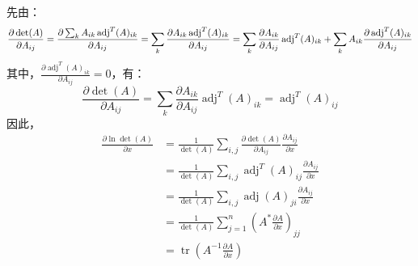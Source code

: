 \documentclass[UTF8,a4paper,AutoFakeBold,AutoFakeSlant]{article}
\begin{document}
\subsection{}
先由：
\begin{equation*}
  \frac{\partial \operatorname{det}(A)}{\partial A_{i j}}=\frac{\partial \sum_{k} A_{i k} \operatorname{adj}^{T}(A)_{i k}}{\partial A_{i j}}=\sum_{k} \frac{\partial A_{i k} \operatorname{adj}^{T}(A)_{i k}}{\partial A_{i j}} \\
  =\sum_{k} \frac{\partial A_{i k}}{\partial A_{i j}} \operatorname{adj}^{T}(A)_{i k}+\sum_{k} A_{i k} \frac{\partial \operatorname{adj}^{T}(A)_{i k}}{\partial A_{i j}}
\end{equation*}
其中，$ \frac{\partial \operatorname{adj}^{T}(A)_{i k}}{\partial A_{i j}} = 0 $，有：
\begin{equation*}
  \frac{\partial \operatorname{det}(A)}{\partial A_{i j}} = \sum_{k} \frac{\partial A_{i k}}{\partial A_{i j}} \operatorname{adj}^{T}(A)_{i k} = \operatorname{adj}^{T}(A)_{i j}
\end{equation*}
因此，
\begin{equation*}
  \begin{aligned}
    \frac{\partial \ln \operatorname{det}(A)}{\partial x} & = \frac{1}{\operatorname{det}(A)} \sum_{i, j} \frac{\partial \operatorname{det}(A)}{\partial A_{i j}} \frac{\partial A_{i j}}{\partial x} \\
                                                          & = \frac{1}{\operatorname{det}(A)} \sum_{i, j} \operatorname{adj}^{T}(A)_{i j} \frac{\partial A_{i j}}{\partial x}                         \\
                                                          & = \frac{1}{\operatorname{det}(A)} \sum_{i, j} \operatorname{adj}(A)_{j i} \frac{\partial A_{i j}}{\partial x}                             \\
                                                          & = \frac{1}{\operatorname{det}(A)} \sum_{j = 1}^{n}\left(A^{*} \frac{\partial A}{\partial x}\right)_{j j}                                  \\
                                                          & = \operatorname{tr}\left(A^{-1} \frac{\partial A}{\partial x}\right)
  \end{aligned}
\end{equation*}
\end{document}
